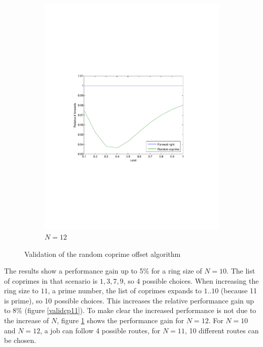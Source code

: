 \documentclass[10pt,a4paper]{article}
\begin{document}
\begin{figure}
\begin{subfigure}[b]{0.49\textwidth}
			\includegraphics[clip=true, trim=9em 24em 9em 24em, width=\textwidth]{resources/plotrandcoprime12.pdf}
			\caption{$N=12$}
			\label{validcp12}
		\end{subfigure}
\caption{Validation of the random coprime offset algorithm}
\label{validcp}
\end{figure}

The results show a performance gain up to 5\% for a ring size of $N=10$. The list of coprimes in that scenario is ${1, 3, 7, 9}$, so 4 possible choices. When increasing the ring size to $11$, a prime number, the list of coprimes expands to ${1..10}$ (because 11 is prime), so 10 possible choices. This increases the relative performance gain up to 8\% (figure \ref{validcp11}). To make clear the increased performance is not due to the increase of $N$, figure \ref{validcp12} shows the performance gain for $N=12$. For $N=10$ and $N=12$, a job can follow 4 possible routes, for $N=11$, 10 different routes can be chosen.
\end{document}
